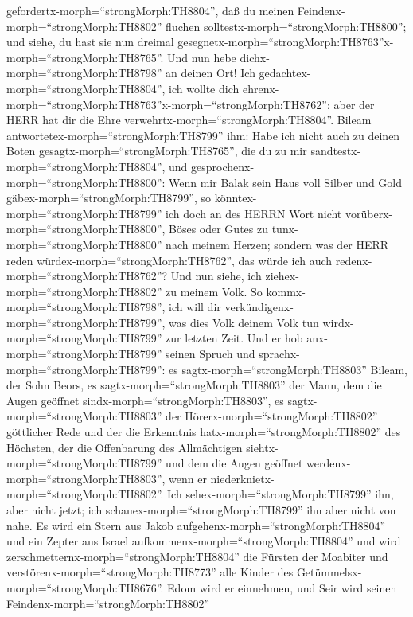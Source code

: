 gefordertx-morph=``strongMorph:TH8804'', daß du meinen
Feindenx-morph=``strongMorph:TH8802'' fluchen
solltestx-morph=``strongMorph:TH8800''; und siehe, du hast sie nun
dreimal
gesegnetx-morph=``strongMorph:TH8763''x-morph=``strongMorph:TH8765''.
 Und nun hebe dichx-morph=``strongMorph:TH8798'' an deinen
Ort! Ich gedachtex-morph=``strongMorph:TH8804'', ich wollte dich
ehrenx-morph=``strongMorph:TH8763''x-morph=``strongMorph:TH8762''; aber
der HERR hat dir die Ehre verwehrtx-morph=``strongMorph:TH8804''.
 Bileam antwortetex-morph=``strongMorph:TH8799'' ihm: Habe
ich nicht auch zu deinen Boten gesagtx-morph=``strongMorph:TH8765'', die
du zu mir sandtestx-morph=``strongMorph:TH8804'', und
gesprochenx-morph=``strongMorph:TH8800'':  Wenn mir Balak
sein Haus voll Silber und Gold gäbex-morph=``strongMorph:TH8799'', so
könntex-morph=``strongMorph:TH8799'' ich doch an des HERRN Wort nicht
vorüberx-morph=``strongMorph:TH8800'', Böses oder Gutes zu
tunx-morph=``strongMorph:TH8800'' nach meinem Herzen; sondern was der
HERR reden würdex-morph=``strongMorph:TH8762'', das würde ich auch
redenx-morph=``strongMorph:TH8762''?  Und nun siehe, ich
ziehex-morph=``strongMorph:TH8802'' zu meinem Volk. So
kommx-morph=``strongMorph:TH8798'', ich will dir
verkündigenx-morph=``strongMorph:TH8799'', was dies Volk deinem Volk tun
wirdx-morph=``strongMorph:TH8799'' zur letzten Zeit.  Und
er hob anx-morph=``strongMorph:TH8799'' seinen Spruch und
sprachx-morph=``strongMorph:TH8799'': es
sagtx-morph=``strongMorph:TH8803'' Bileam, der Sohn Beors, es
sagtx-morph=``strongMorph:TH8803'' der Mann, dem die Augen geöffnet
sindx-morph=``strongMorph:TH8803'',  es
sagtx-morph=``strongMorph:TH8803'' der
Hörerx-morph=``strongMorph:TH8802'' göttlicher Rede und der die
Erkenntnis hatx-morph=``strongMorph:TH8802'' des Höchsten, der die
Offenbarung des Allmächtigen siehtx-morph=``strongMorph:TH8799'' und dem
die Augen geöffnet werdenx-morph=``strongMorph:TH8803'', wenn er
niederknietx-morph=``strongMorph:TH8802''.  Ich
sehex-morph=``strongMorph:TH8799'' ihn, aber nicht jetzt; ich
schauex-morph=``strongMorph:TH8799'' ihn aber nicht von nahe. Es wird
ein Stern aus Jakob aufgehenx-morph=``strongMorph:TH8804'' und ein
Zepter aus Israel aufkommenx-morph=``strongMorph:TH8804'' und wird
zerschmetternx-morph=``strongMorph:TH8804'' die Fürsten der Moabiter und
verstörenx-morph=``strongMorph:TH8773'' alle Kinder des
Getümmelsx-morph=``strongMorph:TH8676''.  Edom wird er
einnehmen, und Seir wird seinen Feindenx-morph=``strongMorph:TH8802''
